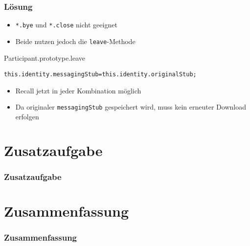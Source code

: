 \documentclass{beamer}
\begin{document}
\begin{frame}[fragile]
	\frametitle{Lösung}
	\begin{itemize}
		\item \texttt{*.bye} und \texttt{*.close} nicht geeignet
		\item Beide nutzen jedoch die \texttt{leave}-Methode
	\end{itemize}
	
	\begin{exampleblock}{Participant.prototype.leave}
		\begin{lstlisting}[linewidth=1.0\textwidth=small]
		this.identity.messagingStub=this.identity.originalStub;
		\end{lstlisting}
	\end{exampleblock}
	
	\begin{itemize}
		\item Recall jetzt in jeder Kombination möglich
		\item Da originaler \texttt{messagingStub} gespeichert wird, muss kein erneuter Download erfolgen
	\end{itemize}
\end{frame}




\section{Zusatzaufgabe}
\begin{frame}
	\frametitle{Zusatzaufgabe}

\end{frame}



\section{Zusammenfassung}
\begin{frame}
	\frametitle{Zusammenfassung}

\end{frame}
\end{document}
